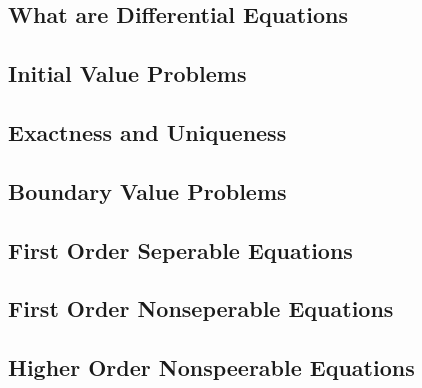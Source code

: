 \documentclass[../Math_Notes.tex]{subfiles}
\begin{document}
\subsection{What are Differential Equations}
\subsection{Initial Value Problems}
\subsection{Exactness and Uniqueness}
\subsection{Boundary Value Problems}
\subsection{First Order Seperable Equations}
\subsection{First Order Nonseperable Equations}
\subsection{Higher Order Nonspeerable Equations}
\end{document}
